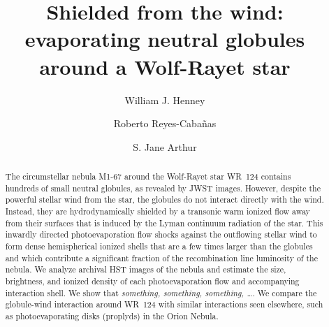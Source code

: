 \documentclass[twocolumn, times]{aastex631}
\begin{document}
\title{Shielded from the wind: evaporating neutral globules around a Wolf-Rayet star}
\author[0000-0001-6208-9109]{William J. Henney}

\author[0000-0000-0000-0000]{Roberto Reyes-Cabañas}

\author[0000-0002-5456-4472]{S. Jane Arthur}


\begin{abstract}
  The circumstellar nebula M1-67 around the Wolf-Rayet star WR~124
  contains hundreds of small neutral globules, as revealed by JWST images.
  However, despite the powerful stellar wind from the star, the globules
  do not interact directly with the wind.
  Instead, they are hydrodynamically shielded by a transonic warm ionized
  flow away from their surfaces that is induced by the Lyman continuum radiation
  of the star.
  This inwardly directed photoevaporation flow shocks against the
  outflowing stellar wind to form dense hemispherical ionized shells
  that are a few times larger than the globules
  and which contribute a significant fraction of the recombination line luminosity
  of the nebula.
  We analyze archival HST images of the nebula and estimate the size, brightness,
  and ionized density of each photoevaporation flow and accompanying interaction shell.
  We show that \textit{something, something, something, \dots}.
  We compare the globule-wind interaction around WR~124 with similar interactions
  seen elsewhere, such as photoevaporating disks (proplyds) in the Orion Nebula.
\end{abstract}
\end{document}
